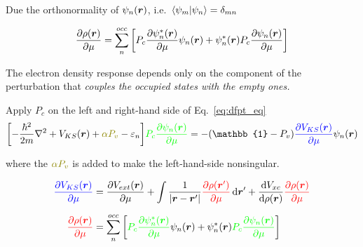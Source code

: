 \begin{frame}[allowframebreaks]
  Due the orthonormality of $\psi_n(\boldsymbol{r})$, i.e.\ $\braket{\psi_m | \psi_n} = \delta_{mn}$

  \begin{equation}
    \label{eq:density_response}
    \frac{
      \partial \rho(\boldsymbol{r})
    }{
      \partial \mu
    }
    =
    \sum_n^{occ}
    \left[
      P_c
        \frac{
        \partial \psi_n^*(\boldsymbol{r})
        }{
        \partial \mu
        }
        \psi_n(\boldsymbol{r})
        +
        \psi_n^*(\boldsymbol{r})
        P_c
        \frac{
        \partial \psi_n(\boldsymbol{r})
        }{
        \partial \mu
        }
    \right]
  \end{equation}

  The electron density response depends only on the component of the
  perturbation that \emph{ couples the occupied states with the empty ones.}

  \break

  Apply $P_c$ on the left and right-hand side of Eq.~\ref{eq:dfpt_eq}
  \begin{equation}
    \label{eq:dfpt_eq_final}
    \biggl[
    -{\hbar^2\over2m}\nabla^2 + V_{KS}(\boldr)
    +
    \mathcolor{olive}{
      \alpha P_v
    }
    - \varepsilon_n
    \biggr]
    \mathcolor{green}{
        P_c
        \frac{
        \partial \psi_n(\boldr)
        }{
        \partial\mu
        }
    }
    =
    -(\mathbb{1} - P_v)
    \mathcolor{blue}{
    \frac{
      \partial V_{KS}(\boldr)
    }{
      \partial\mu
    }
    }
    \psi_n(\boldr)
  \end{equation}

  where the $\mathcolor{olive}{\alpha P_v}$ is added to make the left-hand-side nonsingular.

  \begin{align}
    \mathcolor{blue}{
    \frac{
      \partial V_{KS}(\boldr)
    }{
      \partial \mu
    }}
    &=
    \frac{
      \partial V_{ext}(\boldr)
    }{
      \partial \mu
    }
    +
    \int \frac{
      1
    }{
      |\boldr - \boldr'|
    }
    \mathcolor{red}{
      \frac{
      \partial \rho(\boldr')
      }{
      \partial \mu
    }} \, \mathrm{d}\boldr'
    +
    \frac{
      \mathrm{d} V_{xc}
    }{
      \mathrm{d} \rho(\boldr)
    }
    \mathcolor{red}{
      \frac{
      \partial \rho(\boldr)
      }{
      \partial \mu
    }} \label{eq:perturbation_final}
    \\[6pt]
    \mathcolor{red}{
        \frac{
        \partial \rho(\boldr)
        }{
        \partial \mu
        }
    }
    &=
    \sum_n^{occ}
    \left[
      \mathcolor{green}{
        P_c
        \frac{
        \partial \psi_n^*(\boldr)
        }{
        \partial \mu
        }
      }
      \psi_n(\boldr)
      +
      \psi_n^*(\boldr)
      \mathcolor{green}{
        P_c
        \frac{
        \partial \psi_n(\boldr)
        }{
        \partial \mu
        }
      }
    \right]
    \nonumber
  \end{align}



\end{frame}
